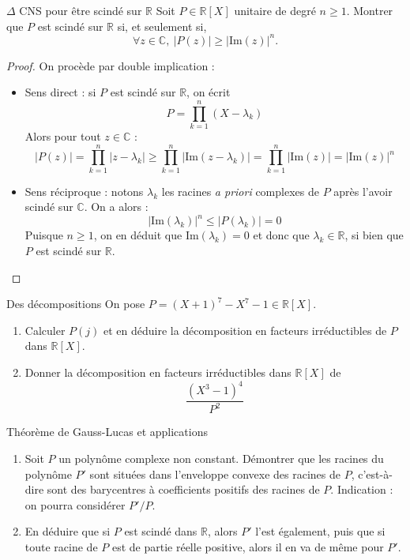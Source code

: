\documentclass[french,a4paper]{article}
\newcommand{\R}{\mathbb{R}}
\newcommand{\C}{\mathbb{C}}
\newcommand{\im}{\text{Im}}
\theoremstyle{plain}
\theoremstyle{definition}
\theoremstyle{remark}
\begin{document}
\begin{ex}{$\Delta$ CNS pour être scindé sur $\R$}
	Soit $P\in\R[X]$ unitaire de degré $n\geqslant1$. Montrer que $P$ est scindé sur $\R$ si, et seulement si, $$\forall z\in\C,\ \lvert P(z)\rvert\geqslant\lvert\im(z)\rvert^n.$$
\end{ex}
\begin{proof}
	On procède par double implication :
	\begin{itemize}
		\item Sens direct : si $P$ est scindé sur $\R$, on écrit $$P=\prod_{k=1}^{n}(X-\lambda_k)$$ Alors pour tout $z\in\C$ : $$\lvert P(z)\rvert=\prod_{k=1}^{n}\lvert z-\lambda_k\rvert \geqslant \prod_{k=1}^{n}\lvert\im(z-\lambda_k)\rvert=\prod_{k=1}^{n}\lvert\im(z)\rvert=\lvert\im(z)\rvert ^n$$
		\item Sens réciproque : notons $\lambda_k$ les racines \textit{a priori} complexes de $P$ après l'avoir scindé sur $\C$. On a alors : $$\lvert\im(\lambda_k)\rvert^n\leqslant\lvert P(\lambda_k)\rvert=0$$ Puisque $n\geqslant1$, on en déduit que $\im(\lambda_k)=0$ et donc que $\lambda_k\in\R$, si bien que $P$ est scindé sur $\R$.
	\end{itemize}
\end{proof}

\begin{ex}{Des décompositions}
	On pose $P=(X+1)^7-X^7-1\in\R[X]$.
	\begin{enumerate}
		\item Calculer $P(j)$ et en déduire la décomposition en facteurs irréductibles de $P$ dans $\R[X]$.
		\item Donner la décomposition en facteurs irréductibles dans $\R[X]$ de $$\frac{(X^3-1)^4}{P^2}$$
	\end{enumerate}
\end{ex}

\begin{ex}[Châteaux]{Théorème de Gauss-Lucas et applications}
	\begin{enumerate}
		\item Soit $P$ un polynôme complexe non constant. Démontrer que les racines du polynôme $P'$ sont situées dans l'enveloppe convexe des racines de $P$, c'est-à-dire sont des barycentres à coefficients positifs des racines de $P$. Indication : on pourra considérer $P'/P$.
		\item En déduire que si $P$ est scindé dans $\R$, alors $P'$ l'est également, puis que si toute racine de $P$ est de partie réelle positive, alors il en va de même pour $P'$.
	\end{enumerate}
\end{ex}
\end{document}
